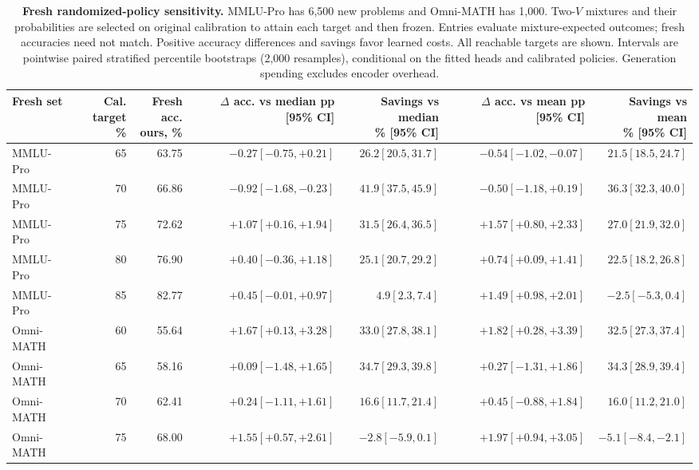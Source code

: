 \begin{table}[t]
\centering
\footnotesize
\setlength{\tabcolsep}{3pt}
\begin{tabular}{lrrrrrr}
\toprule
Fresh set & \shortstack{Cal. target\\\%} & \shortstack{Fresh acc.\\ours, \%} & \shortstack{$\Delta$ acc. vs median\\pp [95\% CI]} & \shortstack{Savings vs median\\\% [95\% CI]} & \shortstack{$\Delta$ acc. vs mean\\pp [95\% CI]} & \shortstack{Savings vs mean\\\% [95\% CI]} \\
\midrule
MMLU-Pro & 65 & 63.75 & $-0.27 [-0.75, +0.21]$ & $26.2 [20.5, 31.7]$ & $-0.54 [-1.02, -0.07]$ & $21.5 [18.5, 24.7]$ \\
MMLU-Pro & 70 & 66.86 & $-0.92 [-1.68, -0.23]$ & $41.9 [37.5, 45.9]$ & $-0.50 [-1.18, +0.19]$ & $36.3 [32.3, 40.0]$ \\
MMLU-Pro & 75 & 72.62 & $+1.07 [+0.16, +1.94]$ & $31.5 [26.4, 36.5]$ & $+1.57 [+0.80, +2.33]$ & $27.0 [21.9, 32.0]$ \\
MMLU-Pro & 80 & 76.90 & $+0.40 [-0.36, +1.18]$ & $25.1 [20.7, 29.2]$ & $+0.74 [+0.09, +1.41]$ & $22.5 [18.2, 26.8]$ \\
MMLU-Pro & 85 & 82.77 & $+0.45 [-0.01, +0.97]$ & $4.9 [2.3, 7.4]$ & $+1.49 [+0.98, +2.01]$ & $-2.5 [-5.3, 0.4]$ \\
\midrule
Omni-MATH & 60 & 55.64 & $+1.67 [+0.13, +3.28]$ & $33.0 [27.8, 38.1]$ & $+1.82 [+0.28, +3.39]$ & $32.5 [27.3, 37.4]$ \\
Omni-MATH & 65 & 58.16 & $+0.09 [-1.48, +1.65]$ & $34.7 [29.3, 39.8]$ & $+0.27 [-1.31, +1.86]$ & $34.3 [28.9, 39.4]$ \\
Omni-MATH & 70 & 62.41 & $+0.24 [-1.11, +1.61]$ & $16.6 [11.7, 21.4]$ & $+0.45 [-0.88, +1.84]$ & $16.0 [11.2, 21.0]$ \\
Omni-MATH & 75 & 68.00 & $+1.55 [+0.57, +2.61]$ & $-2.8 [-5.9, 0.1]$ & $+1.97 [+0.94, +3.05]$ & $-5.1 [-8.4, -2.1]$ \\
\bottomrule
\end{tabular}
\caption{\textbf{Fresh randomized-policy sensitivity.} MMLU-Pro has 6,500 new problems and Omni-MATH has 1,000. Two-$V$ mixtures and their probabilities are selected on original calibration to attain each target and then frozen. Entries evaluate mixture-expected outcomes; fresh accuracies need not match. Positive accuracy differences and savings favor learned costs. All reachable targets are shown. Intervals are pointwise paired stratified percentile bootstraps (2,000 resamples), conditional on the fitted heads and calibrated policies. Generation spending excludes encoder overhead.}
\label{tab:randomized}
\end{table}
